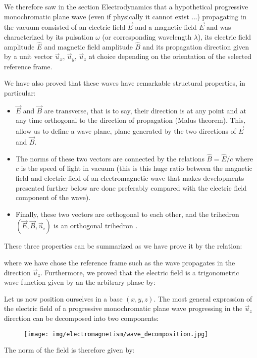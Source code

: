 	We therefore saw in the section Electrodynamics that a hypothetical progressive monochromatic plane wave (even if physically it cannot exist ...) propagating in the vacuum consisted of an electric field $\vec{E}$ and a magnetic field $\vec{E}$ and was characterized by its pulsation $\omega$ (or corresponding wavelength $\lambda$), its electric field amplitude $\hat{E}$ and magnetic field amplitude $\hat{B}$ and its propagation direction given by a unit vector $\vec{u}_x$, $\vec{u}_y$, $\vec{u}_z$ at choice depending on the orientation of the selected reference frame.
	
	We have also proved that these waves have remarkable structural properties, in particular:
	\begin{itemize}
		\item $\vec{E}$ and $\vec{B}$ are transverse, that is to say, their direction is at any point and at any time orthogonal to the direction of propagation (Malus theorem). This, allow us to define a wave plane, plane generated by the two directions of $\vec{E}$ and $\vec{B}$.

		\item The norms of these two vectors are connected by the relations $\hat{B}=\hat{E}/c$ where $c$ is the speed of light in vacuum (this is this huge ratio between the magnetic field and electric field of an electromagnetic wave that makes developments presented further below are done preferably compared with the electric field component of the wave).

		\item Finally, these two vectors are orthogonal to each other, and the trihedron $(\vec{E},\vec{B},\vec{u}_i)$ is an orthogonal trihedron .
	\end{itemize}
	These three properties can be summarized as we have prove it by the relation:
	
	where we have chose the reference frame such as the wave propagates in the direction $\vec{u}_z$. Furthermore, we proved that the electric field is a trigonometric wave function given by an the arbitrary phase by:
	
	Let us now position ourselves in a base $(x, y, z)$. The most general expression of the electric field of a progressive monochromatic plane wave progressing in the $\vec{u}_z$ direction can be decomposed into two components:
	
	\begin{figure}[H]
		\centering
		\texttt{[image: img/electromagnetism/wave\_decomposition.jpg]}
	\end{figure}
	The norm of the field is therefore given by:
	
